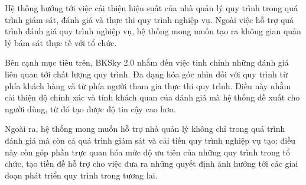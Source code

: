 Hệ thống hướng tới việc cải thiện hiệu suất của nhà quản lý quy trình trong quá trình giám sát, đánh giá và thực thi quy trình nghiệp vụ. Ngoài việc hỗ trợ quá trình đánh giá quy trình nghiệp vụ, hệ thống mong muốn tạo ra không gian quản lý bám sát thực tế với tổ chức.

Bên cạnh mục tiêu trên, BKSky 2.0 nhắm đến việc tinh chỉnh những đánh giá liên quan tới chất lượng quy trình. Đa dạng hóa góc nhìn đối với quy trình từ phía khách hàng và từ phía người tham gia thực thi quy trình. Điều này nhằm cải thiện độ chính xác và tính khách quan của đánh giá mà hệ thống đề xuất cho người dùng, từ đó tạo được độ tin cậy cao hơn.

Ngoài ra, hệ thống mong muốn hỗ trợ nhà quản lý không chỉ trong quá trình đánh giá mà còn cả quá trình giám sát và cải tiến quy trình nghiệp vụ tạo; điều này còn góp phần trực quan hóa mức độ ưu tiên của những quy trình trong tổ chức, tạo tiền đề hỗ trợ cho việc đưa ra những quyết định ảnh hưởng tới các giai đoạn phát triển quy trình trong tương lai.